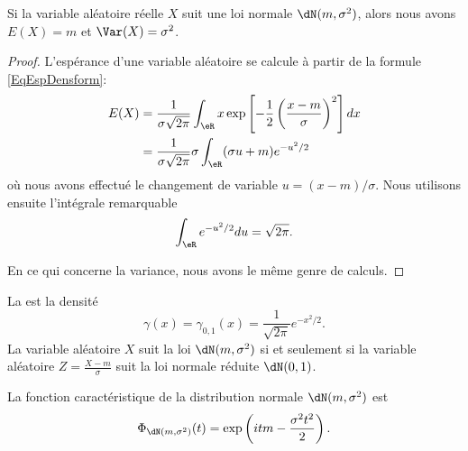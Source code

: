 \begin{proposition}
    Si la variable aléatoire réelle \( X\) suit une loi normale \( \dN(m,\sigma^2)\), alors nous avons \( E(X)=m\) et \( \Var(X)=\sigma^2\).
\end{proposition}

\begin{proof}
    L'espérance d'une variable aléatoire se calcule à partir de la formule \eqref{EqEspDensform}:
    \begin{subequations}
        \begin{align}
            E(X)&=\frac{1}{ \sigma\sqrt{2\pi} }\int_{\eR}x\exp\left[ -\frac{1}{ 2 }\left( \frac{ x-m }{ \sigma } \right)^2 \right]dx\\
            &=\frac{1}{ \sigma\sqrt{2\pi} }\sigma\int_{\eR}(\sigma u+m) e^{-u^2/2}
        \end{align}
    \end{subequations}
    où nous avons effectué le changement de variable \( u=(x-m)/\sigma\). Nous utilisons ensuite l'intégrale remarquable
    \begin{equation}
        \int_{\eR} e^{-u^2/2}du=\sqrt{2\pi}.
    \end{equation}

    En ce qui concerne la variance, nous avons le même genre de calculs.
\end{proof}

La  est la densité
\begin{equation}
    \gamma(x)=\gamma_{0,1}(x)=\frac{1}{ \sqrt{2\pi} } e^{-x^2/2}.
\end{equation}
La variable aléatoire \( X\) suit la loi \( \dN(m,\sigma^2)\) si et seulement si la variable aléatoire $Z=\frac{ X-m }{ \sigma }$ suit la loi normale réduite \( \dN(0,1)\).

\begin{proposition}     \label{PropFnCaractNorm}
    La fonction caractéristique de la distribution normale \( \dN(m,\sigma^2)\) est
    \begin{equation}
        \Phi_{\dN(m,\sigma^2)}(t)=\exp\left( itm-\frac{ \sigma^2t^2 }{ 2 } \right).
    \end{equation}
\end{proposition}

